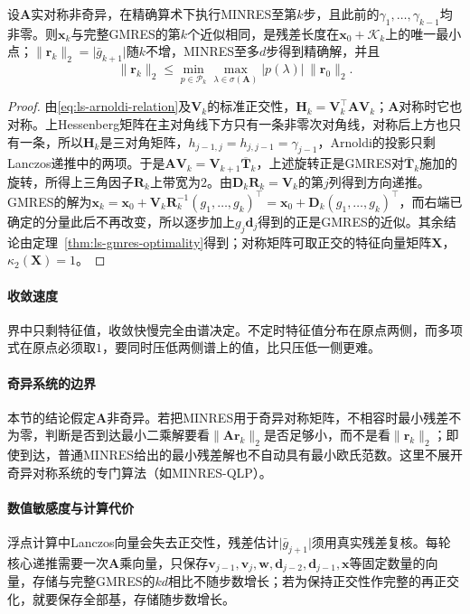 \begin{theorem}[MINRES的最小残差性]
\label{thm:ls-minres-optimality}
设$\bm A$实对称非奇异，在精确算术下执行MINRES至第$k$步，且此前的$\gamma_1,\ldots,\gamma_{k-1}$均非零。则$\bm x_k$与完整GMRES的第$k$个近似相同，是残差长度在$\bm x_0+\mathcal K_k$上的唯一最小点；$\lVert\bm r_k\rVert_2=\lvert\bar g_{k+1}\rvert$随$k$不增，MINRES至多$d$步得到精确解，并且
\[
 \lVert\bm r_k\rVert_2\le\min_{p\in\mathcal P_k}\max_{\lambda\in\sigma(\bm A)}\lvert p(\lambda)\rvert\,\lVert\bm r_0\rVert_2 .
\]
\end{theorem}

\begin{proof}
由\eqref{eq:ls-arnoldi-relation}及$\bm V_k$的标准正交性，$\bm H_k=\bm V_k^\top\bm A\bm V_k$；$\bm A$对称时它也对称。上Hessenberg矩阵在主对角线下方只有一条非零次对角线，对称后上方也只有一条，所以$\bm H_k$是三对角矩阵，$h_{j-1,j}=h_{j,j-1}=\gamma_{j-1}$，Arnoldi的投影只剩Lanczos递推中的两项。于是$\bm A\bm V_k=\bm V_{k+1}\overline{\bm T}_k$，上述旋转正是GMRES对$\overline{\bm T}_k$施加的旋转，所得上三角因子$\bm R_k$上带宽为$2$。由$\bm D_k\bm R_k=\bm V_k$的第$j$列得到方向递推。GMRES的解为$\bm x_k=\bm x_0+\bm V_k\bm R_k^{-1}(g_1,\ldots,g_k)^\top=\bm x_0+\bm D_k(g_1,\ldots,g_k)^\top$，而右端已确定的分量此后不再改变，所以逐步加上$g_j\bm d_j$得到的正是GMRES的近似。其余结论由定理~\ref{thm:ls-gmres-optimality}得到；对称矩阵可取正交的特征向量矩阵$\bm X$，$\kappa_2(\bm X)=1$。
\end{proof}

\paragraph{收敛速度}
界中只剩特征值，收敛快慢完全由谱决定。不定时特征值分布在原点两侧，而多项式在原点必须取$1$，要同时压低两侧谱上的值，比只压低一侧更难。

\paragraph{奇异系统的边界}
本节的结论假定$\bm A$非奇异。若把MINRES用于奇异对称矩阵，不相容时最小残差不为零，判断是否到达最小二乘解要看$\lVert\bm A\bm r_k\rVert_2$是否足够小，而不是看$\lVert\bm r_k\rVert_2$；即使到达，普通MINRES给出的最小残差解也不自动具有最小欧氏范数。这里不展开奇异对称系统的专门算法（如MINRES-QLP）。

\paragraph{数值敏感度与计算代价}
浮点计算中Lanczos向量会失去正交性，残差估计$\lvert\bar g_{j+1}\rvert$须用真实残差复核。每轮核心递推需要一次$\bm A$乘向量，只保存$\bm v_{j-1},\bm v_j,\bm w,\bm d_{j-2},\bm d_{j-1},\bm x$等固定数量的向量，存储与完整GMRES的$kd$相比不随步数增长；若为保持正交性作完整的再正交化，就要保存全部基，存储随步数增长。


